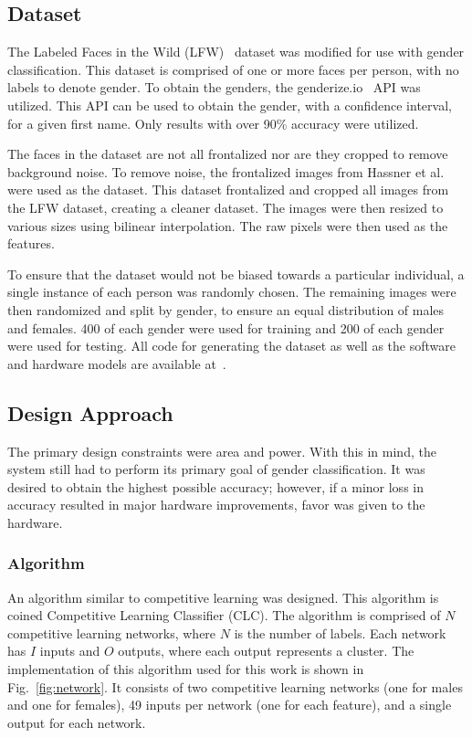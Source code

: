 \documentclass[10pt,journal]{IEEEtran}
\newcommand{\fig}[1]{Fig.~\ref{#1}}
\begin{document}
	\subsection{Dataset}
		The Labeled Faces in the Wild (LFW)~\cite{lfw} dataset was modified for use with gender classification. This dataset is comprised of one or more faces per person, with no labels to denote gender. To obtain the genders, the genderize.io~\cite{genderize} API was utilized. This API can be used to obtain the gender, with a confidence interval, for a given first name. Only results with over 90\% accuracy were utilized.
		
		The faces in the dataset are not all frontalized nor are they cropped to remove background noise. To remove noise, the frontalized images from Hassner et al.~\cite{frontalize} were used as the dataset. This dataset frontalized and cropped all images from the LFW dataset, creating a cleaner dataset. The images were then resized to various sizes using bilinear interpolation. The raw pixels were then used as the features.
		
		To ensure that the dataset would not be biased towards a particular individual, a single instance of each person was randomly chosen. The remaining images were then randomized and split by gender, to ensure an equal distribution of males and females. 400 of each gender were used for training and 200 of each gender were used for testing. All code for generating the dataset as well as the software and hardware models are available at~\cite{gitrepo}.
	
	\subsection{Design Approach}
		The primary design constraints were area and power. With this in mind, the system still had to perform its primary goal of gender classification. It was desired to obtain the highest possible accuracy; however, if a minor loss in accuracy resulted in major hardware improvements, favor was given to the hardware.
		
		\subsubsection{Algorithm}
			An algorithm similar to competitive learning was designed. This algorithm is coined Competitive Learning Classifier (CLC). The algorithm is comprised of \(N\) competitive learning networks, where \(N\) is the number of labels. Each network has \(I\) inputs and \(O\) outputs, where each output represents a cluster. The implementation of this algorithm used for this work is shown in \fig{fig:network}. It consists of two competitive learning networks (one for males and one for females), 49 inputs per network (one for each feature), and a single output for each network.
			
\end{document}
